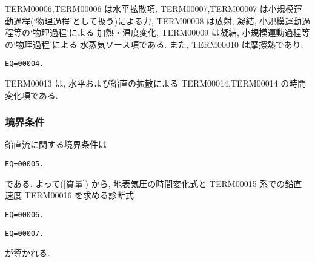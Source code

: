 TERM00006,TERM00006
は水平拡散項,
TERM00007,TERM00007
は小規模運動過程(`物理過程'として扱う)による力,
TERM00008 は放射, 凝結, 小規模運動過程等の`物理過程'による
加熱・温度変化,
TERM00009 は凝結, 小規模運動過程等の`物理過程'による
水蒸気ソース項である.
また, TERM00010 は摩擦熱であり,
%
\begin{verbatim}
EQ=00004.
\end{verbatim}
%
TERM00013 は,
水平および鉛直の拡散による TERM00014,TERM00014 の時間変化項である.

\subsubsection{境界条件}

鉛直流に関する境界条件は
%
\begin{verbatim}
EQ=00005.
\end{verbatim}
%
である. よって(\ref{質量}) から,
地表気圧の時間変化式と
TERM00015 系での鉛直速度 TERM00016 を求める診断式
%
\begin{verbatim}
EQ=00006.
\end{verbatim}
%
\begin{verbatim}
EQ=00007.
\end{verbatim}
%
が導かれる.



